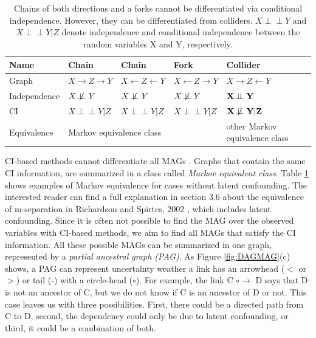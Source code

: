 \documentclass[conference]{IEEEtran}
\begin{document}
\begin{table}[htbp] 
\begin{center}
    \caption{Chains of both directions and a forks cannot be differentiated via conditional independence. However, they can be differentiated from colliders. $X\!\perp\!\!\!\perp Y$ and $X\!\perp\!\!\!\perp Y|Z$ denote independence and conditional independence between the random variables X and Y, respectively.}
\begin{tabular}{@{}l|lll|l@{}}
\toprule
Name         & Chain   & Chain   & Fork    & Collider \\ \midrule
    Graph & $X\rightarrow Z \rightarrow Y$ & $X\leftarrow Z \leftarrow Y$ & $X\leftarrow Z \rightarrow Y$ & $X\rightarrow Z \leftarrow Y$ \\
    Independence & $X\not\!\perp\!\!\!\perp Y$    & $X\not\!\perp\!\!\!\perp Y$    & $X\not\!\perp\!\!\!\perp Y$   & $ \bf{X\!\perp\!\!\!\perp Y}  $       \\
    CI           & $X\!\perp\!\!\!\perp Y|Z$   & $X\!\perp\!\!\!\perp Y|Z$   & $X\!\perp\!\!\!\perp Y|Z$  & $\bf{X\not\!\perp\!\!\!\perp Y|Z}$      \\
    Equivalence & \multicolumn{3}{l|}{Markov equivalence class} & other Markov equivalence class \\ \bottomrule
\end{tabular}
        \label{tab:equiq}
\end{center}
\end{table}
CI-based methods cannot differentiate all MAGs \cite{richardson_ancestral_2002}. Graphs that contain the same CI information, are summarized in a class called \textit{Markov equivalent class}. Table \ref{tab:equiq} shows examples of Markov equivalence for cases without latent confounding. The interested reader can find a full explanation in section 3.6 about the equivalence of m-separation in Richardson and Spirtes, 2002 \cite{richardson_ancestral_2002}, which includes latent confounding. 
Since it is often not possible to find the MAG over the observed variables with CI-based methods, we aim to find all MAGs that satisfy the CI information. All these possible MAGs can be summarized in one graph, represented by a \textit{partial ancestral graph (PAG)}\cite{zhang_causal_2008}.
As Figure \ref{fig:DAGMAG}(c) shows, a PAG can represent uncertainty weather a link has an arrowhead ($<$ or $>$) or tail (-) with a circle-head ($\circ$). For example, the link C $\circ$$\rightarrow$ D says that D is not an ancestor of C, but we do not know if C is an ancestor of D or not. 
This case leaves us with three possibilities. First, there could be a directed path from C to D, second, the dependency could only be due to latent confounding, or third, it could be a combination of both. 
\end{document}
